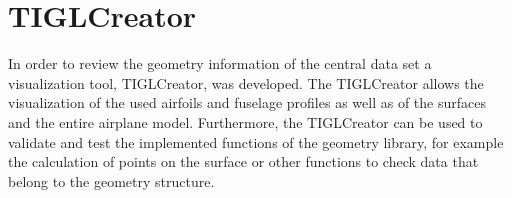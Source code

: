 \section{TIGLCreator}
In order to review the geometry information of the central data set a visualization
tool, TIGLCreator, was developed. The TIGLCreator allows the visualization of the used airfoils and
fuselage profiles as well as of the surfaces and the entire airplane model.
Furthermore, the TIGLCreator can be used to validate and test the implemented
functions of the geometry library, for example the calculation of points on the
surface or other functions to check data that belong to the geometry structure.










